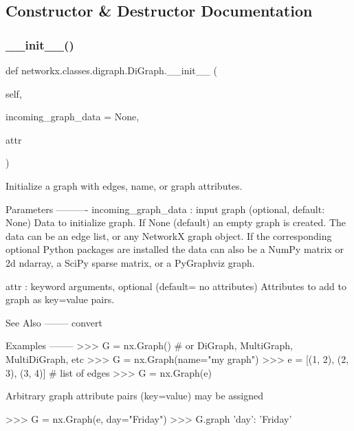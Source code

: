 \subsection{Constructor \& Destructor Documentation}
\mbox{\label{classnetworkx_1_1classes_1_1digraph_1_1DiGraph_a505f7e2f0dd2ce9f8c2a2ce40bd8953b}} 
\subsubsection{\texorpdfstring{\+\_\+\+\_\+init\+\_\+\+\_\+()}{\_\_init\_\_()}}
{\footnotesize\ttfamily def networkx.\+classes.\+digraph.\+Di\+Graph.\+\_\+\+\_\+init\+\_\+\+\_\+ (\begin{DoxyParamCaption}\item[{}]{self,  }\item[{}]{incoming\+\_\+graph\+\_\+data = {\ttfamily None},  }\item[{}]{attr }\end{DoxyParamCaption})}

\begin{DoxyVerb}Initialize a graph with edges, name, or graph attributes.

Parameters
----------
incoming_graph_data : input graph (optional, default: None)
    Data to initialize graph.  If None (default) an empty
    graph is created.  The data can be an edge list, or any
    NetworkX graph object.  If the corresponding optional Python
    packages are installed the data can also be a NumPy matrix
    or 2d ndarray, a SciPy sparse matrix, or a PyGraphviz graph.

attr : keyword arguments, optional (default= no attributes)
    Attributes to add to graph as key=value pairs.

See Also
--------
convert

Examples
--------
>>> G = nx.Graph()  # or DiGraph, MultiGraph, MultiDiGraph, etc
>>> G = nx.Graph(name="my graph")
>>> e = [(1, 2), (2, 3), (3, 4)]  # list of edges
>>> G = nx.Graph(e)

Arbitrary graph attribute pairs (key=value) may be assigned

>>> G = nx.Graph(e, day="Friday")
>>> G.graph
{'day': 'Friday'}\end{DoxyVerb}
 

